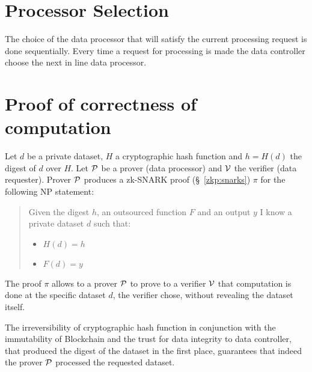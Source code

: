 \section{Processor Selection}
\label{solution:pr_selection}

The choice of the data processor that will satisfy the current processing request is done sequentially. Every time a request for processing is made the data controller choose the next in line data processor.

\section{Proof of correctness of computation}
\label{solution:proof}

Let $d$ be a private dataset, $H$ a cryptographic hash function and $h = H(d)$ the digest of $d$ over $H$. Let $\mathcal{P}$ be a prover (data processor) and $\mathcal{V}$ the verifier (data requester). Prover $\mathcal{P}$ produces a zk-SNARK proof (§~\ref{zkp:snarks}) $\pi$ for the following NP statement:

\blockquote{
  Given the digest $h$, an outsourced function $F$ and an output $y$ I know a private dataset $d$ such that:
    \begin{itemize}
      \item $H(d) = h$
      \item $F(d) = y$
    \end{itemize}
}

The proof $\pi$ allows to a prover $\mathcal{P}$ to prove to a verifier $\mathcal{V}$ that computation is done at the specific dataset $d$, the verifier chose, without revealing the dataset itself.

The irreversibility of cryptographic hash function in conjunction with the immutability of Blockchain and the trust for data integrity to data controller, that produced the digest of the dataset in the first place, guarantees that indeed the prover $\mathcal{P}$ processed the requested dataset.

